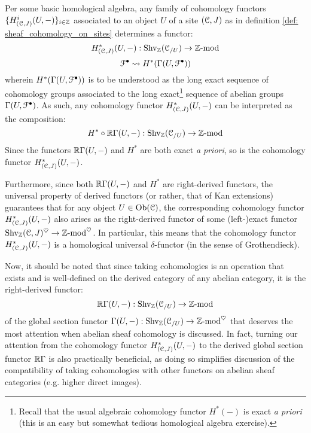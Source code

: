             \begin{remark} \label{remark: cohomology_functors_are_exact}
                Per some basic homological algebra, any family of cohomology functors $\{H^i_{(\mathcal{C}, J)}(U, -)\}_{i \in \mathbb{Z}}$ associated to an object $U$ of a site $(\mathcal{C}, J)$ as in definition \ref{def: sheaf_cohomology_on_sites} determines a functor:
                    $$H^*_{(\mathcal{C}, J)}(U, -): \mathrm{Shv}_{\mathbb{Z}}(\mathcal{C}_{/U}) \to \mathbb{Z}\text{-}\mathrm{mod}$$
                    $$\mathcal{F}^{\bullet} \leadsto H^*(\Gamma(U, \mathcal{F}^{\bullet}))$$
                wherein $H^*(\Gamma(U, \mathcal{F}^{\bullet}))$ is to be understood as the long exact sequence of cohomology groups associated to the long exact\footnote{Recall that the usual algebraic cohomology functor $H^*(-)$ is exact \textit{a priori} (this is an easy but somewhat tedious homological algebra exercise).} sequence of abelian groups $\Gamma(U, \mathcal{F}^{\bullet})$. As such, any cohomology functor $H^*_{(\mathcal{C}, J)}(U, -)$ can be interpreted as the composition:
                    $$H^* \circ \mathbb{R}\Gamma(U, -): \mathrm{Shv}_{\mathbb{Z}}(\mathcal{C}_{/U}) \to \mathbb{Z}\text{-}\mathrm{mod}$$
                Since the functors $\mathbb{R}\Gamma(U, -)$ and $H^*$ are both exact \textit{a priori}, so is the cohomology functor $H^*_{(\mathcal{C}, J)}(U, -)$. 
                
                Furthermore, since both $\mathbb{R}\Gamma(U, -)$ and $H^*$ are right-derived functors, the universal property of derived functors (or rather, that of Kan extensions) guarantees that for any object $U \in \mathrm{Ob}(\mathcal{C})$, the corresponding cohomology functor $H^*_{(\mathcal{C}, J)}(U, -)$ also arises as the right-derived functor of some (left-)exact functor $\mathrm{Shv}_{\mathbb{Z}}(\mathcal{C}, J)^{\heartsuit} \to \mathbb{Z}\text{-}\mathrm{mod}^{\heartsuit}$. In particular, this means that the cohomology functor $H^*_{(\mathcal{C}, J)}(U, -)$ is a homological universal $\delta$-functor (in the sense of Grothendieck).
                
                Now, it should be noted that since taking cohomologies is an operation that exists and is well-defined on the derived category of any abelian category, it is the right-derived functor:
                    $$\mathbb{R}\Gamma(U, -): \mathrm{Shv}_{\mathbb{Z}}(\mathcal{C}_{/U}) \to \mathbb{Z}\text{-}\mathrm{mod}$$
                of the global section functor $\Gamma(U, -): \mathrm{Shv}_{\mathbb{Z}}(\mathcal{C}_{/U}) \to \mathbb{Z}\text{-}\mathrm{mod}^{\heartsuit}$ that deserves the most attention when abelian sheaf cohomology is discussed. In fact, turning our attention from the cohomology functor $H^*_{(\mathcal{C}, J)}(U, -)$ to the derived global section functor $\mathbb{R}\Gamma$ is also practically beneficial, as doing so simplifies discussion of the compatibility of taking cohomologies with other functors on abelian sheaf categories (e.g. higher direct images).
            \end{remark}
